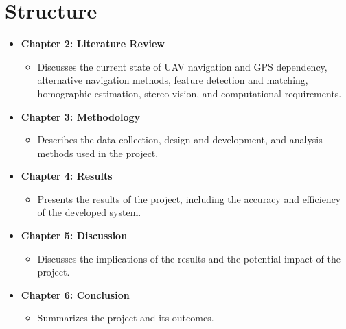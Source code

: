 \section{Structure}

\begin{itemize}
    \item \textbf{Chapter 2: Literature Review}
    \begin{itemize}
        \item Discusses the current state of UAV navigation and GPS dependency, alternative navigation methods, feature detection and matching, homographic estimation, stereo vision, and computational requirements.
    \end{itemize}
    \item \textbf{Chapter 3: Methodology}
    \begin{itemize}
        \item Describes the data collection, design and development, and analysis methods used in the project.
    \end{itemize}
    \item \textbf{Chapter 4: Results}
    \begin{itemize}
        \item Presents the results of the project, including the accuracy and efficiency of the developed system.
    \end{itemize}
    \item \textbf{Chapter 5: Discussion}
    \begin{itemize}
        \item Discusses the implications of the results and the potential impact of the project.
    \end{itemize}
    \item \textbf{Chapter 6: Conclusion}
    \begin{itemize}
        \item Summarizes the project and its outcomes.
    \end{itemize}
\end{itemize}



